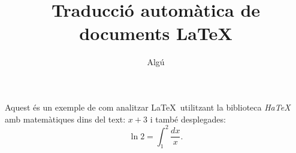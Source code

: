 \documentclass{article}
\author{Algú}
\title{Traducció automàtica de documents \LaTeX}
\begin{document}
\maketitle
Aquest és un exemple de com analitzar \LaTeX\ utilitzant la
biblioteca \emph{HaTeX} amb matemàtiques dins del text: $x+3$ i 
també desplegades:
$$\ln 2 = \int_1^2\frac{dx}{x}.$$
\end{document}
